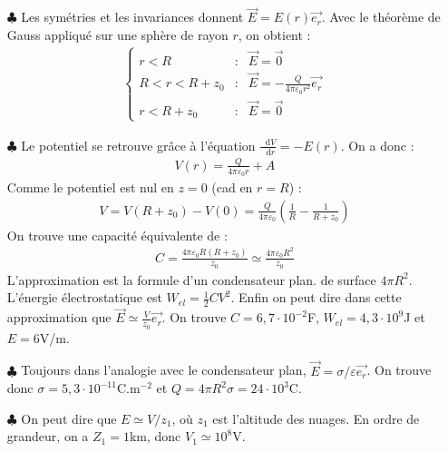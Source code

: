 \documentclass{report}
\newcommand*\dif{\mathop{}\!\mathrm{d}}
\begin{document}
\begin{itemize}

	\item[$\clubsuit$] Les symétries et les invariances donnent $\vec{E}=E(r)\vec{e_r}$. Avec le théorème de Gauss appliqué sur une sphère de rayon $r$, on obtient :
	\begin{align*}
	\left\lbrace
	\begin{array}{ccc}
	r<R & : & \vec{E}=\vec{0} \\
	R<r<R+z_0 & : & \vec{E} = -\frac{Q}{4\pi\varepsilon_0 r^2}\vec{e_r} \\
	r<R+z_0 & : & \vec{E}=\vec{0}
	\end{array}\right.
\end{align*}

	\item[$\clubsuit$] Le potentiel se retrouve grâce à l'équation $\frac{\dif V}{\dif r}=-E(r)$. On a donc :
	\begin{align*}
		V(r) = \frac{Q}{4\pi\varepsilon_0 r}+A
	\end{align*}
Comme le potentiel est nul en $z=0$ (cad en $r=R$) :
	\begin{align*}
		V = V(R+z_0)-V(0) = \frac{Q}{4\pi\varepsilon_0}\left(\frac{1}{R}-\frac{1}{R+z_0} \right) 
	\end{align*}
On trouve une capacité équivalente de :
	\begin{align*}
		C = \frac{4\pi\varepsilon_0R(R+z_0)}{z_0}\simeq\frac{4\pi\varepsilon_0R^2}{z_0}
	\end{align*}
	L'approximation est la formule d'un condensateur plan. de surface $4\pi R^2$. L'énergie électrostatique est $W_{el}=\frac{1}{2}CV^2$. Enfin on peut dire dans cette approximation que $\vec{E}\simeq\frac{V}{z_0}\vec{e_r}$. On trouve $C=6,7\cdot10^{-2}$F, $W_{el}=4,3\cdot10^{9}$J et $E=6$V/m.
	
	\item[$\clubsuit$] Toujours dans l'analogie avec le condensateur plan, $\vec{E}=\sigma/\varepsilon\vec{e_r}$. On trouve donc $\sigma=5,3\cdot10^{-11}$C.m$^{-2}$ et $Q=4\pi R^2\sigma=24\cdot10^{3}$C.
	
	\item[$\clubsuit$] On peut dire que $E\simeq V/z_1$, où $z_1$ est l'altitude des nuages. En ordre de grandeur, on a $Z_1=1$km, donc $V_1\simeq10^8$V.
	
\end{itemize}
\end{document}
